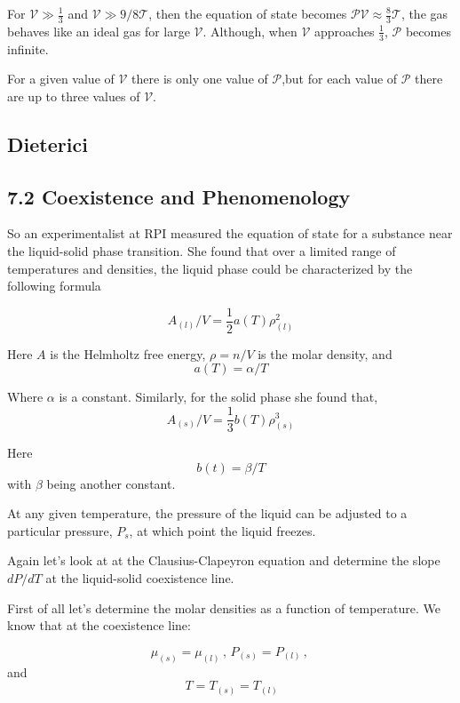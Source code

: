 \documentclass[10pt,twoside,openright]{memoir}
\begin{document}
For $\mathcal{V} \gg \frac{1}{3}$ and $\mathcal{V} \gg 9/8\mathcal{T}$, then the equation of state becomes $\mathcal{PV} \approx \frac{8}{3}\mathcal{T}$, the gas behaves like an ideal gas for large $\mathcal{V}$. Although, when $\mathcal{V}$  approaches $\frac{1}{3}$, $\mathcal{P}$ becomes infinite. 

For a given value of $\mathcal{V}$ there is only one value of  $\mathcal{P}$,but for each value of $\mathcal{P}$ there are up to three values of $\mathcal{V}$.




\subsection{\label{sec:level2} Dieterici}

\subsection{7.2 Coexistence and Phenomenology}
So an experimentalist at RPI measured the equation of state for a substance near the liquid-solid phase transition. She found that over a limited range of temperatures and densities, the liquid phase could be characterized by the following formula

\begin{equation}
A_{(l)}/V = \frac{1}{2}a(T) \rho^{2}_{(l)}
\end{equation}

Here $A$ is the Helmholtz free energy, $\rho = n/V$ is the molar density, and 
$$ a(T) = \alpha/T   $$

Where $\alpha$ is a constant. Similarly, for the solid phase she found that,
\begin{equation}
A_{(s)} / V = \frac{1}{3}b(T) \rho^{3}_{(s)}
\end{equation}

Here
$$ b(t) = \beta/T $$ 
with $\beta$ being another constant.

At any given temperature, the pressure of the liquid can be adjusted to a particular pressure, $P_s$, at which point the liquid freezes.

Again let's look at at the Clausius-Clapeyron equation and determine the slope $dP/dT$ at the liquid-solid coexistence line.

First of all let's determine the molar densities as a function of temperature. We know that at the coexistence line:


$$ \mu_{(s)} = \mu_{(l)} \, , \, P_{(s)}=P_{(l)} \, , \, $$ and $$\, T=T_{(s)}=T_{(l)} $$
\end{document}
